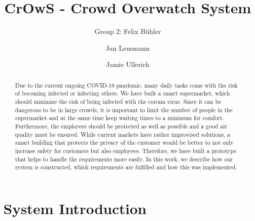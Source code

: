 \documentclass[runningheads]{llncs}
\begin{document}
	\title{CrOwS - Crowd Overwatch System}
	
	\author{Group 2: Felix Bühler \and
		Jan Leusmann \and
		Jamie Ullerich}
	
	\maketitle              %
	\begin{abstract}
		Due to the current ongoing COVID-19 pandemic, many daily tasks come with the risk of becoming infected or infecting others.
		We have built a smart supermarket, which should minimize the risk of being infected with the corona virus.
		Since it can be dangerous to be in large crowds, it is important to limit the number of people in the supermarket and at the same time keep waiting times to a minimum for comfort.
		Furthermore, the employees should be protected as well as possible and a good air quality must be ensured. 
		While current markets have rather improvised solutions, a smart building that protects the privacy of the customer would be better to not only increase safety for customers but also employees. 
		Therefore, we have built a prototype that helps to handle the requirements more easily. 
		In this work, we describe how our system is constructed, which requirements are fulfilled and how this was implemented.  
	\end{abstract}
	\section{System Introduction}
	
\end{document}
